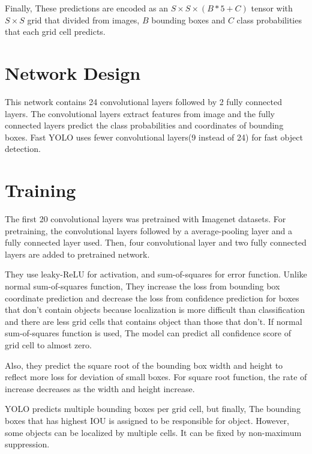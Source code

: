 \documentclass[extendedabs]{bmvc2k}
\begin{document}
Finally, These predictions are encoded as an $S\times S \times (B*5+C)$ tensor with $S\times S$ grid that divided from images, $B$ bounding boxes and $C$ class probabilities that each grid cell predicts.

\section{Network Design}
This network contains 24 convolutional layers followed by 2 fully connected layers. The convolutional layers extract features from image and the fully connected layers predict the class probabilities and coordinates of bounding boxes. Fast YOLO uses fewer convolutional layers(9 instead of 24) for fast object detection.

\section{Training} \label{training}
The first 20 convolutional layers was pretrained with Imagenet datasets. For pretraining, the convolutional layers followed by a average-pooling layer and a fully connected layer used. Then, four convolutional layer and two fully connected layers are added to pretrained network.

They use leaky-ReLU for activation, and sum-of-squares for error function. Unlike normal sum-of-squares function, They increase the loss from bounding box coordinate prediction and decrease the loss from confidence prediction for boxes that don't contain objects because localization is more difficult than classification and there are less grid cells that contains object than those that don't. If normal sum-of-squares function is used, The model can predict all confidence score of grid cell to almost zero.

Also, they predict the square root of the bounding box width and height to reflect more loss for deviation of small boxes. For square root function, the rate of increase decreases as the width and height increase.

YOLO predicts multiple bounding boxes per grid cell, but finally, The bounding boxes that has highest IOU is assigned to be responsible for object. However, some objects can be localized by multiple cells. It can be fixed by non-maximum suppression.
\end{document}
